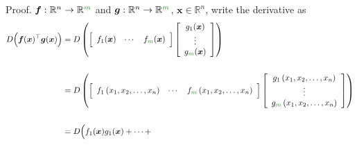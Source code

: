 \documentclass[12pt,thmsa]{article}
\begin{document}
\begin{itemize}
	Proof. 
	\(\boldsymbol{f}: \mathbb{R}^{n} \rightarrow \mathbb{R}^{\color{forestgreen}{m}}\) and \(\boldsymbol{g}: \mathbb{R}^{n} \rightarrow \mathbb{R}^{\color{forestgreen}{m}}\), \(\boldsymbol{x} \in \mathbb{R}^{n}\), write the derivative as 
		\[\begin{aligned}
		D \Big(\boldsymbol{f}(\boldsymbol{x})^{\top} \boldsymbol{g}(\boldsymbol{x})\Big)
		&=D \left(
		\boldsymbol{\Big[} \begin{array}{ccc}
			f_{1}(\boldsymbol{x}) & \cdots & f_{\color{forestgreen}{m}}(\boldsymbol{x})
		\end{array}
		\boldsymbol{\Big]}
		\left[ \begin{array}{c}
			g_{1}(\boldsymbol{x}) \\ \vdots \\ g_{\color{forestgreen}{m}}(\boldsymbol{x})
		\end{array}
		\right]
		\right)
		\\
		& \\
		&=D \left(
		\boldsymbol{\Big[} \begin{array}{ccc}
			f_{1} \left(x_{1}, x_{2}, \ldots, x_{n}\right) 
			& \cdots 
			& f_{\color{forestgreen}{m}}\left(x_{1}, x_{2}, \ldots, x_{n}\right)
		\end{array}
		\boldsymbol{\Big]}
		\left[ \begin{array}{cc}
			g_{1}\left(x_{1}, x_{2}, \ldots, x_{n}\right) \\
			\vdots \\
			g_{\color{forestgreen}{m}}\left(x_{1}, x_{2}, \ldots, x_{n}\right)
		\end{array}
		\right] \right)\\
		& \\
		& = D \Big(
		f_{1}(\boldsymbol{x})g_{1}(\boldsymbol{x}) + \cdots + 

\end{aligned}\]
\end{itemize}
\end{document}
